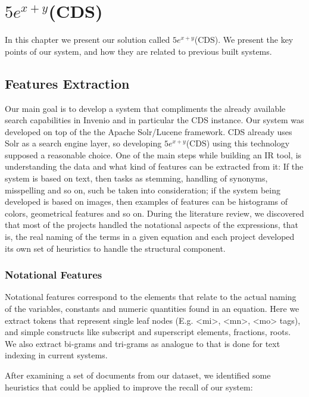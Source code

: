 \chapter{$5e^{x+y}$(CDS)}
\label{chapter-cern_math_explorer}
In this chapter we present our solution called $5e^{x+y}$(CDS). We present the key points of our system, and how they are related to previous built systems.

\section{Features Extraction}
Our main goal is to develop a system that compliments the already available search capabilities in Invenio and in particular the CDS instance. Our system was developed on top of the  the Apache Solr/Lucene framework. CDS already uses Solr as a search engine layer, so developing $5e^{x+y}$(CDS) using this technology supposed a reasonable choice. One of the main steps while building an IR tool, is understanding the data and what kind of features can be extracted from it: If the system is based on text, then tasks as stemming, handling of synonyms, misspelling and so on, such be taken into consideration; if the system being developed is based on images, then examples of features can be histograms of colors, geometrical features and so on. During the literature review, we discovered that most of the projects handled the notational aspects of the expressions, that is, the real naming of the terms in a given equation and each project developed its own set of heuristics to handle the structural component. 


\subsection{Notational Features}
Notational features correspond to the elements that relate to the actual naming of the variables, constants and numeric quantities found in an equation. Here we extract tokens that represent single leaf nodes (E.g. <mi>, <mn>, <mo> tags), and simple constructs like subscript and superscript elements, fractions, roots.
We also extract bi-grams and tri-grams as analogue to that is done for text indexing in current systems.

After examining a set of documents from our dataset, we identified some heuristics that could be applied to improve the recall of our system:

